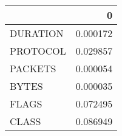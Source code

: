 \begin{tabular}{lr}
\toprule
{} &         0 \\
\midrule
DURATION &  0.000172 \\
PROTOCOL &  0.029857 \\
PACKETS  &  0.000054 \\
BYTES    &  0.000035 \\
FLAGS    &  0.072495 \\
CLASS    &  0.086949 \\
\bottomrule
\end{tabular}
